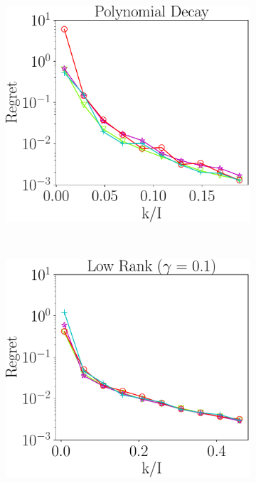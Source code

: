 \begin{figure}
\begin{subfigure}{0.3\textwidth}
	\end{subfigure}
	\begin{subfigure}{0.3\textwidth}
		\includegraphics[scale = 0.24]{figure/fig2_spd_600.pdf}
	\end{subfigure}\\
	\begin{subfigure}{0.3\textwidth}
		\includegraphics[scale = 0.24]{figure/fig2_lk_mnoise_600.pdf}

\end{subfigure}
\end{figure}
